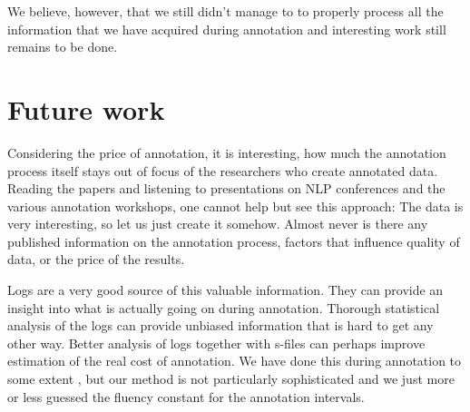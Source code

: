 We believe, however, that we still didn't manage to to properly process all the information that we have acquired during annotation and interesting work still remains to be done.
%

%

\section{Future work}
\label{sec:conc:logs}
Considering the price of annotation, it is interesting, how much the annotation process itself stays out of focus of the researchers who create annotated data. Reading the papers and listening to presentations on NLP conferences and the various annotation workshops, one cannot help but see this approach: The data is very interesting, so let us just create it somehow. Almost never is there any published information on the annotation process, factors that influence quality of data, or the price of the results. 

Logs are a  very good source of this valuable information. They can provide an insight into what is actually going on during annotation. Thorough statistical analysis of the logs can provide unbiased information that is hard to get any other way. Better analysis of logs together with s-files can perhaps improve estimation of the real cost of annotation. We have done this during annotation to some extent , but our method is not particularly sophisticated and we just more or less guessed the fluency constant for the annotation intervals.
 
